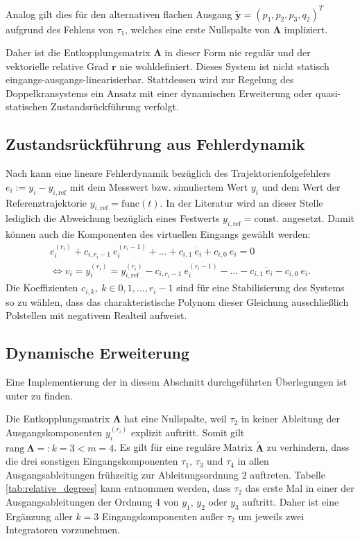 Analog gilt dies für den alternativen flachen Ausgang $\tilde{\mathbf{y}} = (p_1, p_2, p_3, q_2)^T$ aufgrund des Fehlens von $\tau_1$, welches eine erste Nullspalte von $\boldsymbol{\Lambda}$ impliziert.

Daher ist die Entkopplungsmatrix $\boldsymbol{\Lambda}$ in dieser Form nie regulär und der vektorielle relative Grad $\mathbf{r}$ nie wohldefiniert. Dieses System ist nicht statisch eingangs-ausgangs-linearisierbar. Stattdessen wird zur Regelung des Doppelkransystems ein Ansatz mit einer dynamischen Erweiterung oder quasi-statischen Zustandsrückführung verfolgt. 

\subsection{Zustandsrückführung aus Fehlerdynamik}
\label{sec:error_dynamics}
Nach \cite[S. 195]{NLRT_Roebenack} kann eine lineare Fehlerdynamik bezüglich des Trajektorienfolgefehlers $e_i := y_i - y_{i, \text{ref}}$ mit dem Messwert bzw. simuliertem Wert $y_i$ und dem Wert der Referenztrajektorie $y_{i, \text{ref}} = \mathrm{func}(t)$. In der Literatur wird an dieser Stelle lediglich die Abweichung bezüglich eines Festwerts $y_{i, \text{ref}} = \mathrm{const.}$ angesetzt. Damit können auch die Komponenten des virtuellen Eingangs gewählt werden:
\begin{align}
	e_i^{(r_i)} + c_{i, r_i-1} \ e_i^{(r_i-1)} + ... + c_{i, 1} \ \dot{e}_i + c_{i, 0} \ e_i = 0 
	\\
	\Leftrightarrow v_i = y_i^{(r_i)} = y_{i, \text{ref}}^{(r_i)} - c_{i, r_i-1} \ e_i^{(r_i-1)} - ... - c_{i, 1} \ \dot{e}_i - c_{i, 0} \ e_i.
\end{align}
Die Koeffizienten $c_{i, k}, \ k \in {0, 1, ..., r_i-1}$ sind für eine Stabilisierung des Systems so zu wählen, dass das charakteristische Polynom dieser Gleichung ausschließlich Polstellen mit negativem Realteil aufweist.

\subsection{Dynamische Erweiterung}
\label{sec_dynamic_extension_control}
Eine Implementierung der in diesem Abschnitt durchgeführten Überlegungen ist unter \cite[flatness\_notebooks/ODE\_flatness\_trajectory\_control\_simulation\_dyn.ipynb]{SAGithub} zu finden.

Die Entkopplungsmatrix $\boldsymbol{\Lambda}$ hat eine Nullspalte, weil $\tau_2$ in keiner Ableitung der Ausgangskomponenten $y_i^{(r_i)}$ explizit auftritt. Somit gilt $\text{rang} \ \boldsymbol{\Lambda} =: k = 3 < m = 4$. Es gilt für eine reguläre Matrix $\tilde{\boldsymbol{\Lambda}}$ zu verhindern, dass die drei sonstigen Eingangskomponenten $\tau_1$, $\tau_3$ und $\tau_4$ in allen Ausgangsableitungen frühzeitig zur Ableitungsordnung 2 auftreten. Tabelle \ref{tab:relative_degrees} kann entnommen werden, dass $\tau_{2}$ das erste Mal in einer der Ausgangsableitungen der Ordnung 4 von $y_1$, $y_2$ oder $y_3$ auftritt. Daher ist eine Ergänzung aller $k = 3$ Eingangskomponenten außer $\tau_2$ um jeweils zwei Integratoren vorzunehmen. \cite[S. 200]{NLRT_Roebenack}

